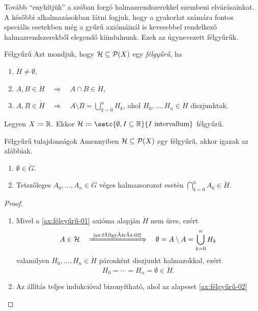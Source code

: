 \documentclass[
]{elteikthesis}[2024/04/26]
\begin{document}
	Tovább ``enyhítjük'' a szóban forgó halmazrendszerekkel szembeni elvárásainkat. 
	A későbbi alkalmazásokban látni fogjuk, hogy a gyakorlat számára 
	fontos speciális esetekben még a gyűrű axiómáinál is kevesebbel rendelkező
	halmazrendszerekből elegendő kiindulnunk. Ezek az úgynevezett félgyűrűk.
	
	\begin{definition}{Félgyűrű}{}
		Azt mondjuk, hogy \( \mathcal{H} \subseteq \mathcal{P}( X ) \) egy \emph{félgyűrű}, ha
		\begin{enumerate}[label={(\( \ring{H} \)\arabic*)}, ref={\( \ring{H} \)\arabic*.}]
			\item\label{ax:félgyűrű-01}
			\( \ring{H} \neq \emptyset \),
			
			\item\label{ax:félgyűrű-02}
			\( A, B \in \ring{H} \quad \Longrightarrow \quad A \cap B \in \ring{H} \),
			
			\item\label{ax:félgyűrű-03}
			\(
				A, B \in \ring{H}
				\quad \Longrightarrow \quad
				A \setminus B = \bigcup\limits_{k=0}^{n} H_k
			\),
			ahol \( H_0, \dots, H_n \in \ring{H} \) diszjunktak.
		\end{enumerate}
	\end{definition}
	
	\begin{example}
		Legyen \( X \coloneq \mathbb{R} \).
		Ekkor \( \ring{H} \coloneq \setc{ \emptyset, I \subseteq \R }{ I \text{ intervallum} } \)
		félgyűrű.
	\end{example}
	
	\begin{statement}{Félgyűrű tulajdonságok}{}
		Amennyiben \( \mathcal{H} \subseteq \mathcal{P}( X ) \) egy félgyűrű, akkor igazak az alábbiak.
		\begin{enumerate}[label={(\( \ring{H} \)\arabic*)}, ref={\( \ring{H} \)\arabic*.}, start=4]
			\item
			\( \emptyset \in \ring{G} \).
			
			\item
			Tetszőleges \( A_0, \dots, A_n \in \ring{G} \) véges halmazsorozat esetén
			\(
				\bigcap\limits_{k=0}^{n} A_k \in \ring{H}
			\).
		\end{enumerate}
	\end{statement}
	\begin{proof}\,
		\begin{enumerate}[label={(\( \ring{H} \)\arabic*)}, ref={\( \ring{H} \)\arabic*.}, start=4]
			\item
			Mivel a \ref{ax:félgyűrű-01} axióma alapján \( \ring{H} \) nem üres, ezért
			\[
				A \in \ring{H}
				\quad \xLongrightarrow{\ \text{\ref{ax:félgyűrű-02}} } \quad
				\emptyset = A \setminus A = \bigcup\limits_{k=0}^{n} H_k
			\]
			valamilyen \( H_0, \dots, H_n \in \ring{H} \) páronként diszjunkt halmazokkal, ezért
			\[
				H_0 = \cdots = H_n = \emptyset \in \ring{H}.
			\]
			
			\item
			Az állítás teljes indukcióval bizonyítható, ahol az alapeset \ref{ax:félgyűrű-02}
		\end{enumerate}
	\end{proof}
	
\end{document}
